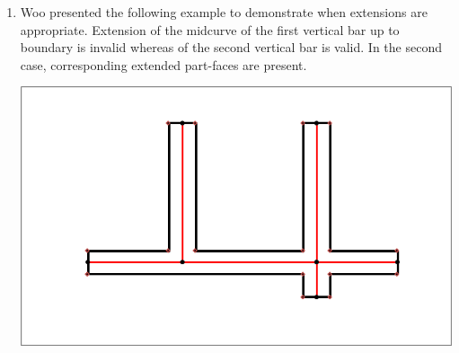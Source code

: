 \begin{enumerate}
\item
Woo \citep{Woo2013}  presented the following example to demonstrate when extensions are appropriate. Extension of the midcurve of the first vertical bar up to boundary is invalid whereas of the second vertical bar is valid. In the second case, corresponding extended part-faces are present. %

\vspace{1mm}

\includegraphics[width=0.65\linewidth]{..//Common/images/Woomc.png}%

%
\end{enumerate}


